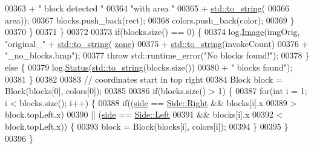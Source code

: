 \begin{DoxyCode}
00363                             + \textcolor{stringliteral}{" block detected "}
00364                             \textcolor{stringliteral}{"with area "}
00365                             + \hyperlink{namespacestd_aa5ddf582a1c96ffe258c997be9a294a3}{std::to\_string}(
00366                                 area));
00367                     blocks.push\_back(rect);
00368                     colors.push\_back(color);
00369                 \}
00370             \}
00371         \}
00372 
00373         \textcolor{keywordflow}{if}(blocks.size() == 0) \{
00374             log.\hyperlink{classChipChipArray_1_1Log_a65bbab057c8b1453f9e4efcfee7522c4}{Image}(imgOrig, \textcolor{stringliteral}{"original\_"} + \hyperlink{namespacestd_aa5ddf582a1c96ffe258c997be9a294a3}{std::to\_string}(
      \hyperlink{classChipChipArray_1_1Grabber_ab57efe6e0b6f369b19528285a278d967}{zone})
00375                     + \hyperlink{namespacestd_aa5ddf582a1c96ffe258c997be9a294a3}{std::to\_string}(invokeCount)
00376                     + \textcolor{stringliteral}{"\_no\_blocks.bmp"});
00377             \textcolor{keywordflow}{throw} std::runtime\_error(\textcolor{stringliteral}{"No blocks found!"});
00378         \} \textcolor{keywordflow}{else} \{
00379             log.\hyperlink{classChipChipArray_1_1Log_a66575b6e94c6112e4cefa5736cb996e0}{Status}(\hyperlink{namespacestd_aa5ddf582a1c96ffe258c997be9a294a3}{std::to\_string}(blocks.size())
00380                     + \textcolor{stringliteral}{" blocks found"});
00381         \}
00382 
00383         \textcolor{comment}{// coordinates start in top right}
00384         Block block = Block(blocks[0], colors[0]);
00385 
00386         \textcolor{keywordflow}{if}(blocks.size() > 1) \{
00387             \textcolor{keywordflow}{for}(\textcolor{keywordtype}{int} i = 1; i < blocks.size(); i++) \{ 
00388                 \textcolor{keywordflow}{if}((\hyperlink{classChipChipArray_1_1Grabber_a8afbaefae7c767c862fd1bf13968539b}{side} == \hyperlink{definitions_8hpp_a03325a8a9d4f105db5e37dd587128142a92b09c7c48c520c3c55e497875da437c}{Side::Right} && blocks[i].x 
00389                             > block.topLeft.x)
00390                         || (\hyperlink{classChipChipArray_1_1Grabber_a8afbaefae7c767c862fd1bf13968539b}{side} == \hyperlink{definitions_8hpp_a03325a8a9d4f105db5e37dd587128142a945d5e233cf7d6240f6b783b36a374ff}{Side::Left}
00391                             && blocks[i].x
00392                             < block.topLeft.x)) \{
00393                     block = Block(blocks[i], colors[i]);
00394                 \}
00395             \}
00396         \}

\end{DoxyCode}
